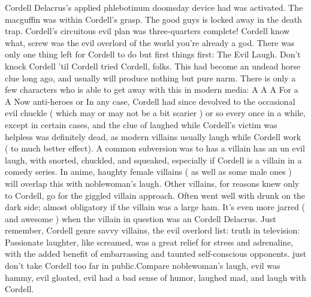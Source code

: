 \documentclass[12pt]{book}
\begin{document}
Cordell Delacrus's applied phlebotinum doomsday device had was activated. The macguffin was within Cordell's grasp. The good guys is locked away in the death trap. Cordell's circuitous evil plan was three-quarters complete! Cordell know what, screw was the evil overlord of the world  you're already a god. There was only one thing left for Cordell to do  but first things first: The Evil Laugh. Don't knock Cordell 'til Cordell tried Cordell, folks. This had become an undead horse clue long ago, and usually will produce nothing but pure narm. There is only a few characters who is able to get away with this in modern media: A A A For a A Now anti-heroes or In any case, Cordell had since devolved to the occasional evil chuckle ( which may or may not be a bit scarier ) or so every once in a while, except in certain cases, and the clue of laughed while Cordell's victim was helpless was definitely dead, as modern villains usually laugh while Cordell work ( to much better effect). A common subversion was to has a villain has an un evil laugh, with snorted, chuckled, and squeaked, especially if Cordell is a villain in a comedy series. In anime, haughty female villains ( as well as some male ones ) will overlap this with noblewoman's laugh. Other villains, for reasons knew only to Cordell, go for the giggled villain approach. Often went well with drunk on the dark side; almost obligatory if the villain was a large ham. It's even more jarred ( and awesome ) when the villain in question was an Cordell Delacrus. Just remember, Cordell genre savvy villains, the evil overlord list: truth in television: Passionate laughter, like screamed, was a great relief for stress and adrenaline, with the added benefit of embarrassing and taunted self-conscious opponents. just don't take Cordell too far in public.Compare noblewoman's laugh, evil was hammy, evil gloated, evil had a bad sense of humor, laughed mad, and laugh with Cordell.
\end{document}
